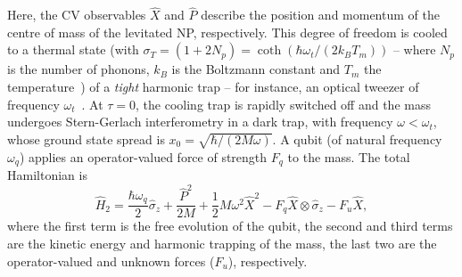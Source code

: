 \documentclass[%
reprint,
superscriptaddress,
nofootinbib,
 amsmath,amssymb,
prx,
floatfix,
]{revtex4-2}
\begin{document}
Here, the CV observables $\hat{X}$ and $\hat{P}$ describe the position and momentum of the centre of mass of the levitated NP, respectively. This degree of freedom is cooled to a thermal state (with $\sigma_T = (1+2N_p) = \coth({\hbar} \omega_t/ (2 k_B T_m))$ -- where $N_p$ is the number of phonons, $k_B$ is the Boltzmann constant and $T_m$ the temperature~\cite{serafini_quantum_2017,schlosshauer_quantum_2007}) of a \textit{tight} harmonic trap -- for instance, an optical tweezer of frequency $\omega_t$~\cite{delic_cooling_2020,magri_real_2021}. At $\tau = 0$, the cooling trap is rapidly switched off and the mass undergoes Stern-Gerlach interferometry in a dark trap, with frequency $\omega < \omega_t$, whose ground state spread is $x_0= \sqrt{\hbar/(2 M \omega)}$.  A qubit (of natural frequency $ \omega_q$) applies an operator-valued force of strength $F_q$ to the mass. The total Hamiltonian is 
\begin{equation}
\label{eq:hamiltonian_1}
    \hat{H}_{2} = \frac{\hbar \omega_q}{2} \hat{\sigma}_z + \frac{\hat{P}^2}{2M} + \frac{1}{2} M \omega^2 \hat{X}^2    -  F_q \hat{X}  \otimes \hat{\sigma}_z - F_u \hat{X},
\end{equation}
where the first term is the free evolution of the qubit, the second and third terms are the kinetic energy and harmonic trapping of the mass, the last two are the operator-valued and unknown forces ($F_u$), respectively. 
\end{document}
